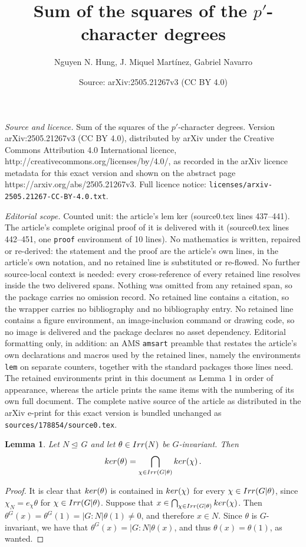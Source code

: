 \documentclass[10pt,a4paper]{amsart}
\title{Sum of the squares of the $p'$-character degrees}
\author{Nguyen N. Hung, J. Miquel Mart\'inez, Gabriel Navarro}
\date{Source: arXiv:2505.21267v3 (CC BY 4.0)}
\newtheorem{lem}{Lemma}
\def\irr#1{{\rm Irr}(#1)}
\def\ker#1{{\rm ker}(#1)}
\def\nor{\trianglelefteq\,}
\begin{document}
\maketitle

\noindent\emph{Source and licence.} Sum of the squares of the $p'$-character degrees. Version arXiv:2505.21267v3 (CC BY 4.0), distributed by arXiv under the Creative Commons Attribution 4.0 International licence, http://creativecommons.org/licenses/by/4.0/, as recorded in the arXiv licence metadata for this exact version and shown on the abstract page https://arxiv.org/abs/2505.21267v3. Full licence notice: \texttt{licenses/arxiv-2505.21267-CC-BY-4.0.txt}.\par\smallskip

\noindent\textit{Editorial scope.} Counted unit: the article's lem ker (source0.tex lines 437--441). The article's complete original proof of it is delivered with it (source0.tex lines 442--451, one \texttt{proof} environment of 10 lines). No mathematics is written, repaired or re-derived: the statement and the proof are the article's own lines, in the article's own notation, and no retained line is substituted or re-flowed.  No further source-local context is needed: every cross-reference of every retained line resolves inside the two delivered spans.  Nothing was omitted from any retained span, so the package carries no omission record.  No retained line contains a citation, so the wrapper carries no bibliography and no bibliography entry.  No retained line contains a figure environment, an image-inclusion command or drawing code, so no image is delivered and the package declares no asset dependency.  Editorial formatting only, in addition: an AMS \texttt{amsart} preamble that restates the article's own declarations and macros used by the retained lines, namely the environments \texttt{lem} on separate counters, together with the standard packages those lines need.  The retained environments print in this document as Lemma 1 in order of appearance, whereas the article prints the same items with the numbering of its own full document.  The complete native source of the article as distributed in the arXiv e-print for this exact version is bundled unchanged as \texttt{sources/178854/source0.tex}.
\begin{lem}\label{ker}
   Let $N\nor G$ and let $\theta \in \irr N$ be $G$-invariant.
   Then
   $$\ker\theta=\bigcap_{\chi \in \irr{G|\theta}} \ker\chi \, .$$
\end{lem}

\begin{proof}
It is clear that $\ker\theta$ is contained in  $\ker\chi$ for every
$\chi \in \irr{G|\theta}$, since $\chi_N=e_\chi \theta$ for $\chi
\in \irr{G|\theta}$. Suppose that $x \in \bigcap_{\chi \in
\irr{G|\theta}} \ker\chi$. Then
$\theta^G(x)=\theta^G(1)=|G:N|\theta(1) \ne 0$, and therefore $x \in N$.
Since $\theta$ is $G$-invariant, we have that
$\theta^G(x)=|G:N|\theta(x)$, and thus $\theta(x)=\theta(1)$,
 as wanted.
\end{proof}
\end{document}
